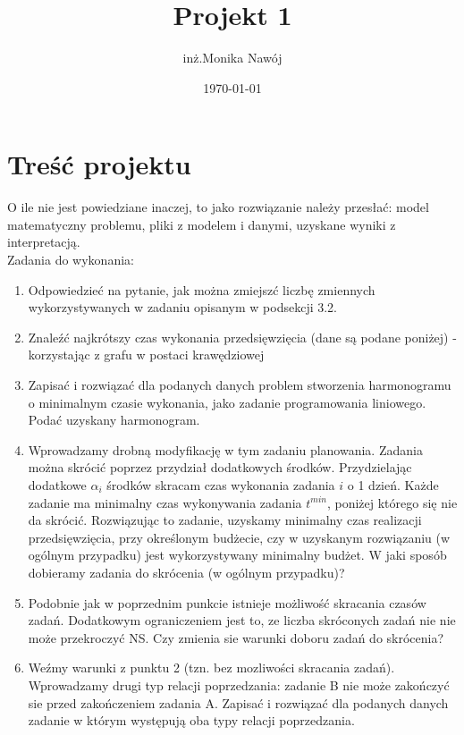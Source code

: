 \documentclass[
    12pt, %
]{../fphw}
\title{Projekt 1} %
\author{inż.Monika Nawój} %
\date{\today} %
\institute{Politechnika Warszawska \\ Wydział Elektroniki i Technik Informacyjnych} %
\begin{document}
\maketitle %


\section{Treść projektu}
O ile nie jest powiedziane inaczej, to jako rozwiązanie należy przesłać: model matematyczny problemu, pliki z modelem i danymi, uzyskane wyniki z
interpretacją. \\
Zadania do wykonania:
\begin{enumerate}
    \item Odpowiedzieć na pytanie, jak można zmiejszć liczbę zmiennych wykorzystywanych w zadaniu opisanym w podsekcji 3.2.
    \item Znaleźć najkrótszy czas wykonania przedsięwzięcia (dane są podane poniżej) - korzystając z grafu w postaci krawędziowej
    \item Zapisać i rozwiązać dla podanych danych problem stworzenia harmonogramu o minimalnym czasie wykonania, jako zadanie programowania
          liniowego. Podać uzyskany harmonogram.
    \item Wprowadzamy drobną modyfikację w tym zadaniu planowania. Zadania można skrócić poprzez przydział dodatkowych środków.
          Przydzielając dodatkowe \(\alpha_i\) środków skracam czas wykonania zadania \(i\) o 1
          dzień. Każde zadanie ma minimalny czas wykonywania zadania \(t^{min}\),
          poniżej którego się nie da skrócić. Rozwiązując to zadanie, uzyskamy
          minimalny czas realizacji przedsięwzięcia, przy określonym budżecie,
          czy w uzyskanym rozwiązaniu (w ogólnym przypadku) jest wykorzystywany minimalny budżet. W jaki sposób dobieramy zadania do skrócenia (w ogólnym przypadku)?
    \item Podobnie jak w poprzednim punkcie istnieje możliwość skracania czasów zadań. Dodatkowym ograniczeniem jest to, ze liczba skróconych
          zadań nie nie może przekroczyć NS. Czy zmienia sie warunki doboru zadań do skrócenia?
    \item Weźmy warunki z punktu 2 (tzn. bez mozliwości skracania zadań).
          Wprowadzamy drugi typ relacji poprzedzania: zadanie B nie może zakończyć sie przed zakończeniem zadania A. Zapisać i rozwiązać dla
          podanych danych zadanie w którym występują oba typy relacji poprzedzania.
\end{enumerate}
\end{document}
